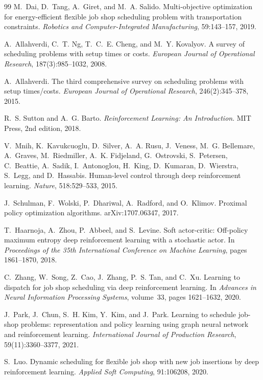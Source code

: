 \begin{thebibliography}{99}
M.~Dai, D.~Tang, A.~Giret, and M.~A. Salido.
Multi-objective optimization for energy-efficient flexible job shop scheduling problem with transportation constraints.
\emph{Robotics and Computer-Integrated Manufacturing}, 59:143--157, 2019.

A.~Allahverdi, C.~T. Ng, T.~C.~E. Cheng, and M.~Y. Kovalyov.
A survey of scheduling problems with setup times or costs.
\emph{European Journal of Operational Research}, 187(3):985--1032, 2008.

A.~Allahverdi.
The third comprehensive survey on scheduling problems with setup times/costs.
\emph{European Journal of Operational Research}, 246(2):345--378, 2015.

R.~S. Sutton and A.~G. Barto.
\emph{Reinforcement Learning: An Introduction}.
MIT Press, 2nd edition, 2018.

V.~Mnih, K.~Kavukcuoglu, D.~Silver, A.~A. Rusu, J.~Veness, M.~G. Bellemare, A.~Graves, M.~Riedmiller, A.~K. Fidjeland, G.~Ostrovski, S.~Petersen, C.~Beattie, A.~Sadik, I.~Antonoglou, H.~King, D.~Kumaran, D.~Wierstra, S.~Legg, and D.~Hassabis.
Human-level control through deep reinforcement learning.
\emph{Nature}, 518:529--533, 2015.

J.~Schulman, F.~Wolski, P.~Dhariwal, A.~Radford, and O.~Klimov.
Proximal policy optimization algorithms.
arXiv:1707.06347, 2017.

T.~Haarnoja, A.~Zhou, P.~Abbeel, and S.~Levine.
Soft actor-critic: Off-policy maximum entropy deep reinforcement learning with a stochastic actor.
In \emph{Proceedings of the 35th International Conference on Machine Learning}, pages 1861--1870, 2018.

C.~Zhang, W.~Song, Z.~Cao, J.~Zhang, P.~S. Tan, and C.~Xu.
Learning to dispatch for job shop scheduling via deep reinforcement learning.
In \emph{Advances in Neural Information Processing Systems}, volume~33, pages 1621--1632, 2020.

J.~Park, J.~Chun, S.~H. Kim, Y.~Kim, and J.~Park.
Learning to schedule job-shop problems: representation and policy learning using graph neural network and reinforcement learning.
\emph{International Journal of Production Research}, 59(11):3360--3377, 2021.

S.~Luo.
Dynamic scheduling for flexible job shop with new job insertions by deep reinforcement learning.
\emph{Applied Soft Computing}, 91:106208, 2020.


\end{thebibliography}
